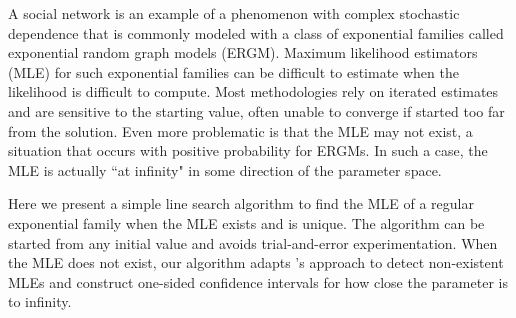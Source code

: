 A social network is an example of a phenomenon with complex stochastic dependence 
that is commonly modeled with a class of exponential families called exponential random graph models (ERGM).
Maximum likelihood estimators (MLE) for such  
exponential families
can be difficult to estimate when the likelihood is difficult to compute.
Most methodologies rely on iterated estimates and are sensitive
to the starting value, often unable to converge if started too far from the
solution.  
Even more problematic is that the MLE may not exist, 
a situation that occurs with positive probability for ERGMs.
In such a case, the MLE 
is actually ``at infinity" in some direction of the parameter space.  

Here we present a simple line search algorithm to find the MLE of a regular exponential 
family when the MLE exists and is unique.  
The algorithm can be started from any 
initial value and avoids trial-and-error experimentation.  
When the MLE does not exist, our algorithm adapts
\citeauthor{Geyer:gdor}'s \citeyearpar{Geyer:gdor} approach
to detect non-existent MLEs and construct one-sided confidence intervals
for how close the parameter is to infinity.
